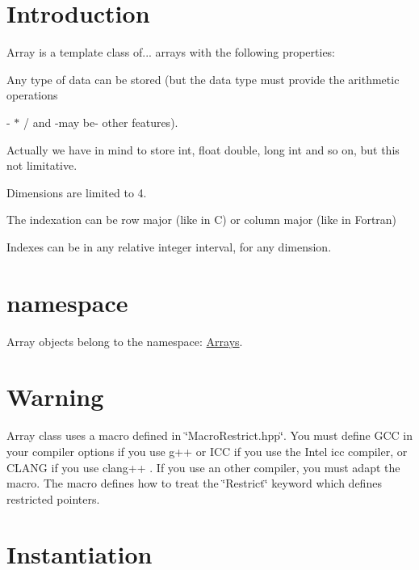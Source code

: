 \hypertarget{index_Introduction}{}\section{Introduction}\label{index_Introduction}
Array is a template class of... arrays with the following properties\+:


\begin{DoxyItemize}
\item Any type of data can be stored (but the data type must provide the arithmetic operations
\begin{DoxyItemize}
\item -\/ $\ast$ / and -\/may be-\/ other features).
\end{DoxyItemize}
\end{DoxyItemize}

Actually we have in mind to store int, float double, long int and so on, but this not limitative.


\begin{DoxyItemize}
\item Dimensions are limited to 4.
\item The indexation can be row major (like in C) or column major (like in Fortran)
\item Indexes can be in any relative integer interval, for any dimension.
\end{DoxyItemize}\hypertarget{index_namespace}{}\section{namespace}\label{index_namespace}
Array objects belong to the namespace\+: \hyperlink{namespaceArrays}{Arrays}.\hypertarget{index_Warning}{}\section{Warning}\label{index_Warning}
Array class uses a macro defined in \char`\"{}\+Macro\+Restrict.\+hpp\char`\"{}. You must define G\+C\+C in your compiler options if you use g++ or I\+C\+C if you use the Intel icc compiler, or C\+L\+A\+N\+G if you use clang++ . If you use an other compiler, you must adapt the macro. The macro defines how to treat the \char`\"{}\+Restrict\char`\"{} keyword which defines restricted pointers.\hypertarget{index_Instantiation}{}\section{Instantiation}\label{index_Instantiation}


